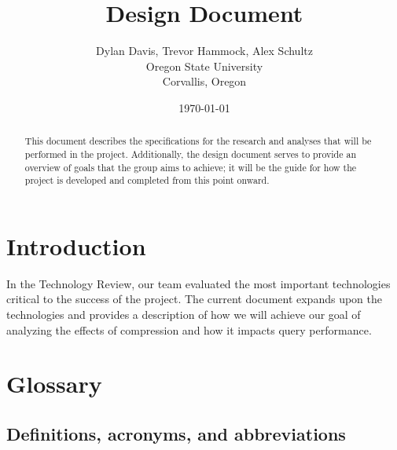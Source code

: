 \documentclass[10pt]{article}
\title{Design Document}
\author{
	Dylan Davis, Trevor Hammock, Alex Schultz \\
	Oregon State University\\
	Corvallis, Oregon
}
\date{\today}
\begin{document}
\begin{titlingpage}
\maketitle

\begin{abstract}
This document describes the specifications for the research and analyses that will be performed in the project. Additionally, the design document serves to provide an overview of goals that the group aims to achieve; it will be the guide for how the project is developed and completed from this point onward. 
\end{abstract}
\end{titlingpage}


\tableofcontents
\clearpage

\section{Introduction}
In the Technology Review, our team evaluated the most important technologies critical to the success of the project. The current document expands upon the technologies and provides a description of how we will achieve our goal of analyzing the effects of compression and how it impacts query performance. 

\section{Glossary}
\subsection{Definitions, acronyms, and abbreviations}
\end{document}
